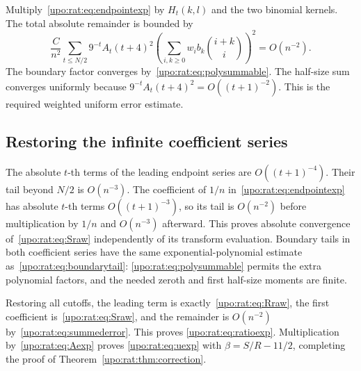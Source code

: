 \documentclass[11pt,letterpaper]{article}
\theoremstyle{remark}\newtheorem{remark}[theorem]{Remark}
\numberwithin{equation}{section}
\begin{document}
Multiply~\eqref{upo:rat:eq:endpointexp} by $H_t(k,l)$ and the two binomial
kernels. The total absolute remainder is bounded by
\begin{equation}\label{upo:rat:eq:summederror}
\frac{C}{n^2}\sum_{t\le N/2}9^{-t}A_t(t+4)^2
\left(\sum_{i,k\ge0}w_i b_k\binom{i+k}{i}\right)^2=O(n^{-2}).
\end{equation}
The boundary factor converges by~\eqref{upo:rat:eq:polysummable}. The half-size
sum converges uniformly because $9^{-t}A_t(t+4)^2=O((t+1)^{-2})$.
This is the required weighted uniform error estimate.

\subsection{Restoring the infinite coefficient series}
The absolute $t$-th terms of the leading endpoint series are
$O((t+1)^{-4})$. Their tail beyond $N/2$ is $O(n^{-3})$.
The coefficient of $1/n$ in~\eqref{upo:rat:eq:endpointexp} has absolute $t$-th
terms $O((t+1)^{-3})$, so its tail is $O(n^{-2})$ before multiplication
by $1/n$ and $O(n^{-3})$ afterward. This proves absolute convergence
of~\eqref{upo:rat:eq:Sraw} independently of its transform evaluation.
Boundary tails in both coefficient series have the same
exponential-polynomial estimate as~\eqref{upo:rat:eq:boundarytail}:
\eqref{upo:rat:eq:polysummable} permits the extra polynomial factors, and the
needed zeroth and first half-size moments are finite.

Restoring all cutoffs, the leading term is exactly~\eqref{upo:rat:eq:Rraw},
the first coefficient is~\eqref{upo:rat:eq:Sraw}, and the remainder is
$O(n^{-2})$ by~\eqref{upo:rat:eq:summederror}. This proves
\eqref{upo:rat:eq:ratioexp}. Multiplication by~\eqref{upo:rat:eq:Aexp} proves
\eqref{upo:rat:eq:uexp} with $\beta=S/R-11/2$, completing the proof of
Theorem~\ref{upo:rat:thm:correction}.
\end{document}
